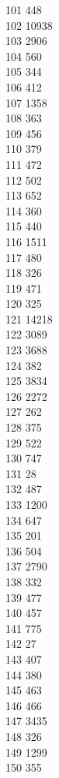 { 101	448 \\
 102	10938 \\
 103	2906 \\
 104	560 \\
 105	344 \\
 106	412 \\
 107	1358 \\
 108	363 \\
 109	456 \\
 110	379 \\
 111	472 \\
 112	502 \\
 113	652 \\
 114	360 \\
 115	440 \\
 116	1511 \\
 117	480 \\
 118	326 \\
 119	471 \\
 120	325 \\
 121	14218 \\
 122	3089 \\
 123	3688 \\
 124	382 \\
 125	3834 \\
 126	2272 \\
 127	262 \\
 128	375 \\
 129	522 \\
 130	747 \\
 131	28 \\
 132	487 \\
 133	1200 \\
 134	647 \\
 135	201 \\
 136	504 \\
 137	2790 \\
 138	332 \\
 139	477 \\
 140	457 \\
 141	775 \\
 142	27 \\
 143	407 \\
 144	380 \\
 145	463 \\
 146	466 \\
 147	3435 \\
 148	326 \\
 149	1299 \\
 150	355 \\
}
